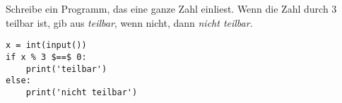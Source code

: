\question[3]
Schreibe ein Programm, das eine ganze Zahl einliest.
Wenn die Zahl durch 3 teilbar ist, gib aus \textit{teilbar}, wenn nicht, dann \textit{nicht teilbar}.
\begin{solutionbox}{5cm}
\begin{lstlisting}
x = int(input())
if x % 3 $==$ 0:
    print('teilbar')
else:
    print('nicht teilbar')
\end{lstlisting}
\end{solutionbox}
